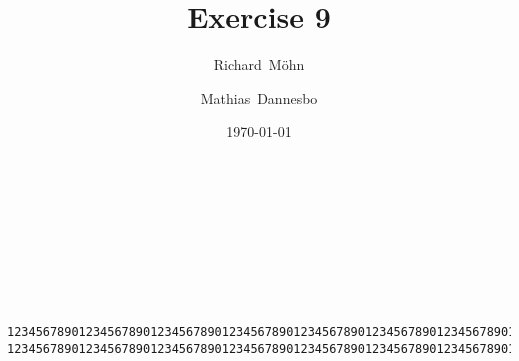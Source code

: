 \documentclass[a4paper,draft,12pt,oneside,article,table]{memoir}
\newcommand{\supertitle}[1]{\gdef\suP{#1}}
\newcommand{\subtitle}[1]{\gdef\suB{#1}}
\newcommand{\stunum}[1]{\gdef\stuN{#1}}
\newcommand{\srcpath}{../ex09/src/main/java/ddist}
\begin{document}
\supertitle{Distributed Systems}
\title{Exercise 9}
\author{Richard~Möhn \and Mathias~Dannesbo}
\stunum{201311231, 201206106}
\date{\today}
\maketitle

\inputminted[tabsize=4]{java}{\srcpath/DisconnectEvent.java}
\inputminted[tabsize=4]{java}{\srcpath/EventReceiver.java}
\inputminted[tabsize=4]{java}{\srcpath/MyTextEvent.java}
\inputminted[tabsize=4]{java}{\srcpath/DistributedTextEditor.java}
\inputminted[tabsize=4]{java}{\srcpath/EventReplayer.java}
\inputminted[tabsize=4]{java}{\srcpath/TextInsertEvent.java}
\inputminted[tabsize=4]{java}{\srcpath/DocumentEventCapturer.java}
\inputminted[tabsize=4]{java}{\srcpath/EventSender.java}
\inputminted[tabsize=4]{java}{\srcpath/TextRemoveEvent.java}

\begin{verbatim}
1234567890123456789012345678901234567890123456789012345678901234567890123456789X
1234567890123456789012345678901234567890123456789012345678901234567890123456789X123456789012345678901234567890
\end{verbatim}

\end{document}

